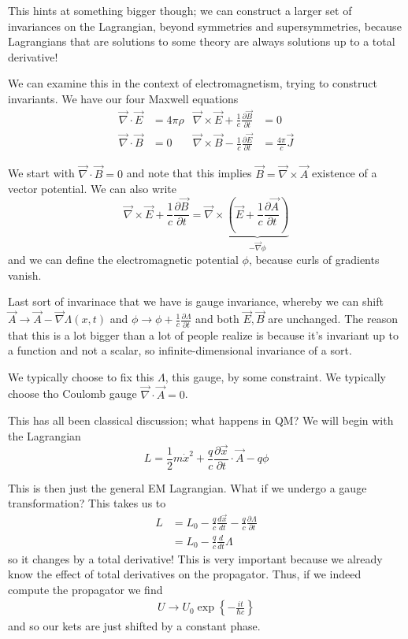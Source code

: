 \documentclass[10pt]{report}
\newcommand{\rd}[2]{\frac{d#1}{d#2}}
\newcommand{\pd}[2]{\frac{\partial #1}{\partial#2}}
\begin{document}
This hints at something bigger though; we can construct a larger set of invariances on the Lagrangian, beyond symmetries and supersymmetries, because Lagrangians that are solutions to some theory are always solutions up to a total derivative! 

We can examine this in the context of electromagnetism, trying to construct invariants. We have our four Maxwell equations
\begin{align}
    \vec{\nabla} \cdot \vec{E} &= 4\pi \rho & \vec{\nabla} \times \vec{E} + \frac{1}{c}\pd{\vec{B}}{t} &= 0\\
    \vec{\nabla} \cdot \vec{B} &= 0 & \vec{\nabla} \times \vec{B} - \frac{1}{c}\pd{\vec{E}}{t} &= \frac{4\pi}{c}\vec{J}
\end{align}

We start with $\vec{\nabla} \cdot \vec{B} = 0$ and note that this implies $\vec{B} = \vec{\nabla} \times \vec{A}$ existence of a vector potential. We can also write 
\begin{equation}
    \vec{\nabla} \times \vec{E} + \frac{1}{c}\pd{\vec{B}}{t} = \vec{\nabla} \times \underbrace{\left( \vec{E} + \frac{1}{c}\pd{\vec{A}}{t} \right)}_{-\vec{\nabla}\phi}
\end{equation}
and we can define the electromagnetic potential $\phi$, because curls of gradients vanish.

Last sort of invarinace that we have is gauge invariance, whereby we can shift $\vec{A} \to \vec{A} - \vec{\nabla} \Lambda(x,t)$ and $\phi \to \phi + \frac{1}{c}\pd{\Lambda}{t}$ and both $\vec{E}, \vec{B}$ are unchanged. The reason that this is a lot bigger than a lot of people realize is because it's invariant up to a function and not a scalar, so infinite-dimensional invariance of a sort. 

We typically choose to fix this $\Lambda$, this gauge, by some constraint. We typically choose tho Coulomb gauge $\vec{\nabla} \cdot \vec{A} = 0$. 

This has all been classical discussion; what happens in QM? We will begin with the Lagrangian
\begin{equation}
    L = \frac{1}{2}m\dot{x}^2 + \frac{q}{c}\pd{\vec{x}}{t}\cdot \vec{A} - q\phi
\end{equation}

This is then just the general EM Lagrangian. What if we undergo a gauge transformation? This takes us to
\begin{align}
    L &= L_0 - \frac{q}{c}\rd{\vec{x}}{t} - \frac{q}{c}\pd{\Lambda}{t}\\
    &= L_0 - \frac{q}{c}\rd{}{t}\Lambda
\end{align}
so it changes by a total derivative! This is very important because we already know the effect of total derivatives on the propagator. Thus, if we indeed compute the propagator we find
\begin{align}
    U\to U_0\exp\left\{ -\frac{it}{\hbar c} \right\}
\end{align}
and so our kets are just shifted by a constant phase.
\end{document}
